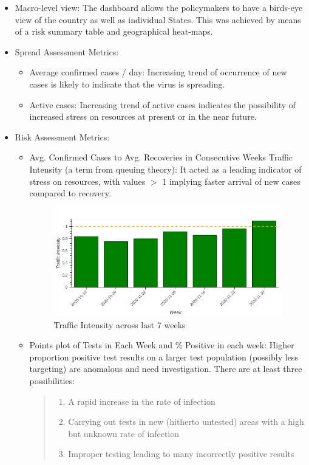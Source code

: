 \documentclass[letterpaper]{article} %
\begin{document}
	\begin{itemize}
		\item Macro-level view: The dashboard allows the policymakers to have a birds-eye view of the country as well as individual States. This was achieved by means of a risk summary table and geographical heat-maps.
		\item Spread Assessment Metrics:
		\begin{itemize}
			\item Average confirmed cases / day: Increasing trend of occurrence of new cases is likely to indicate that the virus is spreading.
			\item Active cases: Increasing trend of active cases indicates the possibility of increased stress on resources at present or in the near future.
		\end{itemize}
		\item Risk Assessment Metrics:
		\begin{itemize}
			\item Avg. Confirmed Cases to Avg. Recoveries in Consecutive Weeks Traffic Intensity (a term from queuing theory): It acted as a leading indicator of stress on resources, with values $>$ 1  implying faster arrival of new cases compared to recovery.
			\begin{figure}[h!]
				\centering
				\includegraphics[width=\linewidth]{ti}
				\caption{Traffic Intensity across last 7 weeks}
				\label{fig:ti}
			\end{figure}
			
			\item Points plot of Tests in Each Week and \% Positive in each week: Higher proportion positive  test results on a larger test population (possibly less targeting) are anomalous and need investigation. There are at least three possibilities: 
			\begin{quote}
				\begin{enumerate}
					\item A rapid increase in the rate of infection 
					\item Carrying out tests in new (hitherto untested) areas with a high but unknown rate of infection 
					\item Improper testing leading to many incorrectly positive results
					

\end{enumerate}
\end{quote}
\end{itemize}
\end{itemize}
\end{document}
